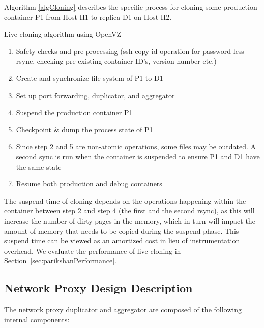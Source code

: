 Algorithm \ref{algCloning} describes the specific process for cloning some production container P1 from Host H1 to replica D1 on Host H2.


\begin{algorithm}[ht!]
	\caption{Live cloning algorithm using OpenVZ} 
	\label{algCloning}
	\begin{enumerate}[topsep=0pt,itemsep=-1ex,partopsep=1ex,parsep=1ex]
		\item Safety checks and pre-processing (ssh-copy-id operation for password-less rsync, checking pre-existing container ID's, version number etc.) 
		\item Create and synchronize file system of P1 to D1  
		\item Set up port forwarding, duplicator, and aggregator
		\item Suspend the production container P1
		\item Checkpoint \& dump the process state of P1
		\item Since step 2 and 5 are non-atomic operations, some files may be outdated.
		A second sync is run when the container is suspended to ensure P1 and D1 have the same state
		\item Resume both production and debug containers
	\end{enumerate}
\end{algorithm}


The suspend time of cloning depends on the operations happening within the container between step 2 and step 4 (the first and the second rsync), as this will increase the number of dirty pages in the memory, which in turn will impact the amount of memory that needs to be copied during the suspend phase.
This suspend time can be viewed as an amortized cost in lieu of instrumentation overhead.
We evaluate the performance of live cloning in Section~\ref{sec:parikshanPerformance}.

\subsection{Network Proxy Design Description}

The network proxy duplicator and aggregator are composed of the following internal components:


